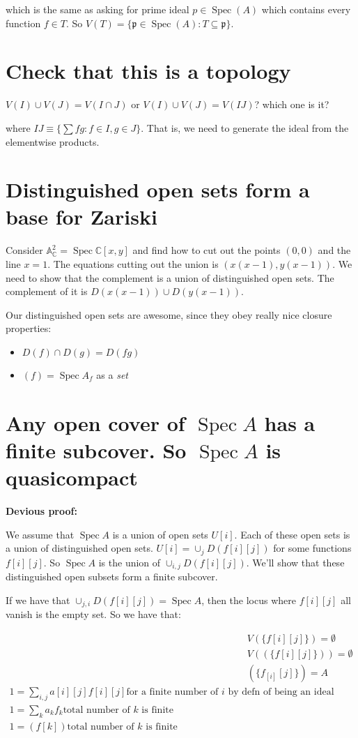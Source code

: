 \documentclass{book}
\newcommand{\C}{\ensuremath{\mathbb{C}}}
\newcommand{\A}{\ensuremath{\mathbb{A}}}
\newcommand{\Spec}{\operatorname{Spec}}
\newcommand{\spec}{\operatorname{Spec}}
\newcommand{\p}{\mathfrak{p}}
\theoremstyle{definition}
\begin{document}
which is the same as asking for prime ideal $p \in \Spec(A)$ which contains
every function $f \in T$. So $V(T) = \{ \p \in \Spec(A): T \subseteq \p \}$.

\section{Check that this is a topology}
$V(I) \cup V(J) = V(I \cap J)$ or $V(I) \cup V(J) = V(IJ)$? which one is it?

where $IJ \equiv \{ \sum fg : f \in I, g \in J\}$. That is, we need to generate
the ideal from the elementwise products.

\section{Distinguished open sets form a base for Zariski}

Consider $\A^2_\C = \spec \C[x, y]$ and find how to cut out the points $(0, 0)$
and the line $x = 1$. The equations cutting out the union is $(x(x-1), y(x-1))$.
We need to show that the complement is a union of distinguished open sets.
The complement of it is $D(x(x-1)) \cup D(y(x-1))$.


Our distinguished open sets are awesome, since they obey really nice closure
properties:
\begin{itemize}
\item $D(f) \cap D(g) = D(fg)$
\item $(f) = \spec A_f$ as a \emph{set}
\end{itemize}



\section{Any open cover of $\spec A$ has a finite subcover. So $\spec A$ is quasicompact}

\textbf{Devious proof:}

We assume that $\spec A$ is a union of open sets $U[i]$. Each of these open sets
is a union of distinguished open sets. $U[i] = \cup_j D(f[i][j])$ for some
functions $f[i][j]$. So $\spec A$
is the union of $\cup_{i, j} D(f[i][j])$. We'll show that these distinguished
open subsets form a finite subcover.

 If we have that $\cup_{j, i} D(f[i][j]) = \spec A$, then the locus where
 $f[i][j]$ all vanish is the empty set. So we have that: 

\begin{align*}
 &V(\{ f[i][j] \}) = \emptyset \\
 &V((\{ f[i][j] \})) = \emptyset \\
 &(\{ f_[i][j] \}) = A \\
 1 = \sum_{i,j} a[i][j] f[i][j] \text{for a finite number of $i$ by defn of being an ideal} \\
 1 = \sum_k a_k f_k \text{total number of $k$ is finite} \\
 1 = (f[k]) \text{total number of $k$ is finite} \\
\end{align*}
\end{document}
